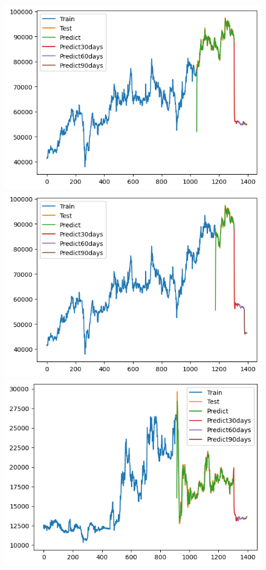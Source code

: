 \begin{figure}[H]
\begin{minipage}{0.15\textwidth}
    \includegraphics[width=1\textwidth]{resources/chapter-5/newdata1/result/KF_VCB_8_2.png}
    \end{minipage}
    \hfill
        \begin{minipage}{0.15\textwidth}
    \centering
    \includegraphics[width=1\textwidth]{resources/chapter-5/newdata1/result/KF_VCB_9_1.png}
    \end{minipage}
    \hfill
    \begin{minipage}{0.15\textwidth}
    \centering
    \includegraphics[width=1\textwidth]{resources/chapter-5/newdata1/result/KF_EXIM_7_3.png}

\end{minipage}
\end{figure}
